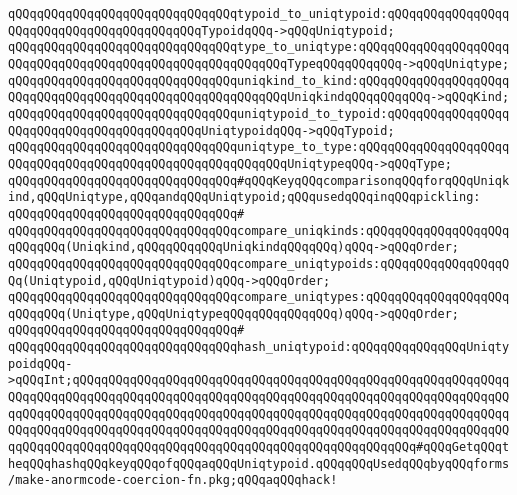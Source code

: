 \verb|qQQqqQQqqQQqqQQqqQQqqQQqqQQqqQQqtypoid_to_uniqtypoid:qQQqqQQqqQQqqQQqqQQqqQQqqQQqqQQqqQQqqQQqqQQqTypoidqQQq->qQQqUniqtypoid;|\newline
\verb|qQQqqQQqqQQqqQQqqQQqqQQqqQQqqQQqtype_to_uniqtype:qQQqqQQqqQQqqQQqqQQqqQQqqQQqqQQqqQQqqQQqqQQqqQQqqQQqqQQqqQQqTypeqQQqqQQqqQQq->qQQqUniqtype;|\newline
\newline
\verb|qQQqqQQqqQQqqQQqqQQqqQQqqQQqqQQquniqkind_to_kind:qQQqqQQqqQQqqQQqqQQqqQQqqQQqqQQqqQQqqQQqqQQqqQQqqQQqqQQqqQQqUniqkindqQQqqQQqqQQq->qQQqKind;|\newline
\verb|qQQqqQQqqQQqqQQqqQQqqQQqqQQqqQQquniqtypoid_to_typoid:qQQqqQQqqQQqqQQqqQQqqQQqqQQqqQQqqQQqqQQqqQQqUniqtypoidqQQq->qQQqTypoid;|\newline
\verb|qQQqqQQqqQQqqQQqqQQqqQQqqQQqqQQquniqtype_to_type:qQQqqQQqqQQqqQQqqQQqqQQqqQQqqQQqqQQqqQQqqQQqqQQqqQQqqQQqqQQqUniqtypeqQQq->qQQqType;|\newline
\newline
\verb|qQQqqQQqqQQqqQQqqQQqqQQqqQQqqQQq#qQQqKeyqQQqcomparisonqQQqforqQQqUniqkind,qQQqUniqtype,qQQqandqQQqUniqtypoid;qQQqusedqQQqinqQQqpickling:|\newline
\verb|qQQqqQQqqQQqqQQqqQQqqQQqqQQqqQQq#|\newline
\verb|qQQqqQQqqQQqqQQqqQQqqQQqqQQqqQQqcompare_uniqkinds:qQQqqQQqqQQqqQQqqQQqqQQqqQQq(Uniqkind,qQQqqQQqqQQqUniqkindqQQqqQQq)qQQq->qQQqOrder;|\newline
\verb|qQQqqQQqqQQqqQQqqQQqqQQqqQQqqQQqcompare_uniqtypoids:qQQqqQQqqQQqqQQqqQQq(Uniqtypoid,qQQqUniqtypoid)qQQq->qQQqOrder;|\newline
\verb|qQQqqQQqqQQqqQQqqQQqqQQqqQQqqQQqcompare_uniqtypes:qQQqqQQqqQQqqQQqqQQqqQQqqQQq(Uniqtype,qQQqUniqtypeqQQqqQQqqQQqqQQq)qQQq->qQQqOrder;|\newline
\newline
\verb|qQQqqQQqqQQqqQQqqQQqqQQqqQQqqQQq#|\newline
\verb|qQQqqQQqqQQqqQQqqQQqqQQqqQQqqQQqhash_uniqtypoid:qQQqqQQqqQQqqQQqUniqtypoidqQQq->qQQqInt;qQQqqQQqqQQqqQQqqQQqqQQqqQQqqQQqqQQqqQQqqQQqqQQqqQQqqQQqqQQqqQQqqQQqqQQqqQQqqQQqqQQqqQQqqQQqqQQqqQQqqQQqqQQqqQQqqQQqqQQqqQQqqQQqqQQqqQQqqQQqqQQqqQQqqQQqqQQqqQQqqQQqqQQqqQQqqQQqqQQqqQQqqQQqqQQqqQQqqQQqqQQqqQQqqQQqqQQqqQQqqQQqqQQqqQQqqQQqqQQqqQQqqQQqqQQqqQQqqQQqqQQqqQQqqQQqqQQqqQQqqQQqqQQqqQQqqQQqqQQqqQQqqQQqqQQqqQQqqQQqqQQqqQQq#qQQqGetqQQqtheqQQqhashqQQqkeyqQQqofqQQqaqQQqUniqtypoid.qQQqqQQqUsedqQQqbyqQQqforms/make-anormcode-coercion-fn.pkg;qQQqaqQQqhack!|\newline
